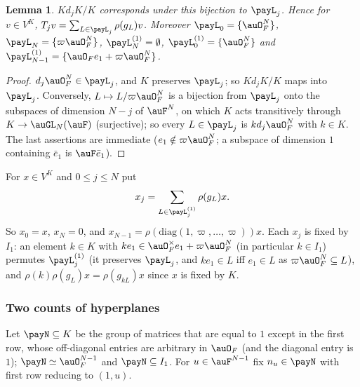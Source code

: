 \documentclass[10pt]{amsart}
\newtheorem{lemma}[theorem]{Lemma}
\theoremstyle{definition}
\theoremstyle{remark}
\begin{document}
\begin{lemma}\label{pay:lat}
$Kd_jK/K$ corresponds under this bijection to $\payL_j$. Hence for $v\in V^K$, $T_jv=\sum_{L\in
\payL_j}\rho(g_L)v$. Moreover $\payL_0=\{\auO_F^N\}$, $\payL_N=\{\varpi\auO_F^N\}$,
$\payL^{(1)}_N=\emptyset$, $\payL^{(1)}_0=\{\auO_F^N\}$ and $\payL^{(1)}_{N-1}=\{\auO_Fe_1+\varpi\auO_F^N
\}$.
\end{lemma}
\begin{proof}
$d_j\auO_F^N\in\payL_j$, and $K$ preserves $\payL_j$; so $Kd_jK/K$ maps into $\payL_j$. Conversely,
$L\mapsto L/\varpi\auO_F^N$ is a bijection from $\payL_j$ onto the subspaces of dimension $N-j$ of
$\auF^N$, on which $K$ acts transitively through $K\to\auGL_N(\auF)$ (surjective); so every $L\in
\payL_j$ is $kd_j\auO_F^N$ with $k\in K$. The last assertions are immediate ($e_1\notin\varpi
\auO_F^N$; a subspace of dimension $1$ containing $\bar e_1$ is $\auF\bar e_1$).
\end{proof}

For $x\in V^K$ and $0\le j\le N$ put
\begin{equation}\label{pay:eq-xj}
x_j=\sum_{L\in\payL^{(1)}_j}\rho(g_L)x .
\end{equation}
So $x_0=x$, $x_N=0$, and $x_{N-1}=\rho(\mathrm{diag}(1,\varpi,\dots,\varpi))x$. Each $x_j$ is fixed by
$I_1$: an element $k\in K$ with $ke_1\in\auO_F^\times e_1+\varpi\auO_F^N$ (in particular $k\in I_1$)
permutes $\payL^{(1)}_j$ (it preserves $\payL_j$, and $ke_1\in L$ iff $e_1\in L$ as $\varpi\auO_F^N
\subseteq L$), and $\rho(k)\rho(g_L)x=\rho(g_{kL})x$ since $x$ is fixed by $K$.

\subsubsection{Two counts of hyperplanes}\label{pay:ss-count}

Let $\payN\subseteq K$ be the group of matrices that are equal to $1$ except in the first row, whose
off-diagonal entries are arbitrary in $\auO_F$ (and the diagonal entry is $1$); $\payN\simeq
\auO_F^{N-1}$ and $\payN\subseteq I_1$. For $u\in\auF^{N-1}$ fix $n_u\in\payN$ with first row reducing
to $(1,u)$.
\end{document}
